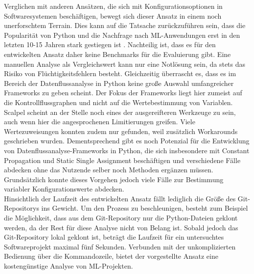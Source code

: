\documentclass[german,bachelor]{swsLeipzig}
\begin{document}
\indent Verglichen mit anderen Ansätzen, die sich mit Konfigurationsoptionen in Softwaresystemen beschäftigen, bewegt sich
dieser Ansatz in einem noch unerforschtem Terrain.
Dies kann auf die Tatsache zurückzuführen sein, dass die Popularität von Python und die Nachfrage nach ML-Anwendungen erst
in den letzten 10-15 Jahren stark gestiegen ist \cite[]{srinath2017python}.
Nachteilig ist, dass es für den entwickelten Ansatz daher keine Benchmarks für die Evaluierung gibt.
Eine manuellen Analyse als Vergleichswert kann nur eine Notlösung sein, da stets das Risiko von Flüchtigkeitsfehlern besteht.
Gleichzeitig überrascht es, dass es im Bereich der Datenflussanalyse in Python keine große Auswahl umfangreicher Frameworks
zu geben scheint.
Der Fokus der Frameworks liegt hier zumeist auf die Kontrollflussgraphen und nicht auf die Wertebestimmung von Variablen.
Scalpel scheint an der Stelle noch eines der ausgereifteren Werkzeuge zu sein, auch wenn hier die angesprochenen
Limitierungen greifen.
Viele Wertezuweisungen konnten zudem nur gefunden, weil zusätzlich Workarounds geschrieben wurden.
Dementsprechend gibt es noch Potenzial für die Entwicklung von Datenflussanalyse-Frameworks in Python, die sich
insbesondere mit Constant Propagation und Static Single Assignment beschäftigen und verschiedene Fälle abdecken ohne das
Nutzende selber noch Methoden ergänzen müssen.
Grundsätzlich konnte dieses Vorgehen jedoch viele Fälle zur Bestimmung variabler Konfigurationswerte abdecken.\\
\indent Hinsichtlich der Laufzeit des entwickelten Ansatz fällt lediglich die Größe des Git-Repositorys ins Gewicht.
Um den Prozess zu beschleunigen, besteht zum Beispiel die Möglichkeit, dass aus dem Git-Repository nur die Python-Dateien
geklont werden, da der Rest für diese Analyse nicht von Belang ist.
Sobald jedoch das Git-Repository lokal geklont ist, beträgt die Laufzeit für ein untersuchtes Softwareprojekt maximal fünf Sekunden.
Verbunden mit der unkomplizierten Bedienung über die Kommandozeile, bietet der vorgestellte Ansatz eine kostengünstige Analyse
von ML-Projekten.


\end{document}
